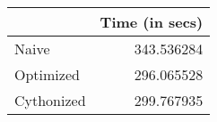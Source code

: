 \begin{tabular}{lr}
\toprule
{} &  Time (in secs) \\
\midrule
Naive      &      343.536284 \\
Optimized  &      296.065528 \\
Cythonized &      299.767935 \\
\bottomrule
\end{tabular}
